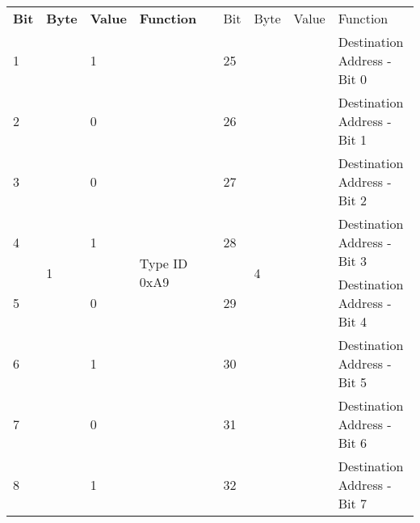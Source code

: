 \documentclass[]{article}
\begin{document}
\begin{landscape}
	\begin{table}[]
		\begin{tabular}{lllllllll}
			\cline{1-4} \cline{6-9}
			\textbf{Bit} & \textbf{Byte}      & \textbf{Value}    & \textbf{Function}             & \multirow{9}{*}{} & Bit & Byte                                                             & Value & Function                    \\ \cline{1-4} \cline{6-9} 
			1            & \multirow{8}{*}{1} & 1                 & \multirow{8}{*}{Type ID 0xA9} &                   & 25  & \multirow{8}{*}{4}                                               &       & Destination Address - Bit 0 \\
			2            &                    & 0                 &                               &                   & 26  &                                                                  &       & Destination Address - Bit 1 \\
			3            &                    & 0                 &                               &                   & 27  &                                                                  &       & Destination Address - Bit 2 \\
			4            &                    & 1                 &                               &                   & 28  &                                                                  &       & Destination Address - Bit 3 \\
			5            &                    & 0                 &                               &                   & 29  &                                                                  &       & Destination Address - Bit 4 \\
			6            &                    & 1                 &                               &                   & 30  &                                                                  &       & Destination Address - Bit 5 \\
			7            &                    & 0                 &                               &                   & 31  &                                                                  &       & Destination Address - Bit 6 \\
			8            &                    & 1                 &                               &                   & 32  &                                                                  &       & Destination Address - Bit 7 \\ \cline{1-4} \cline{6-9} 

\end{tabular}
\end{table}
\end{landscape}
\end{document}
